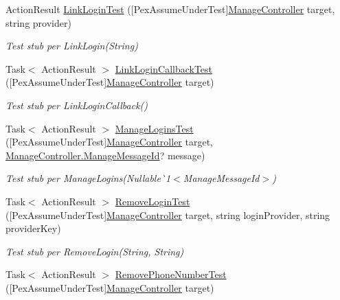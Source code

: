 \begin{DoxyCompactItemize}
Action\+Result \mbox{\hyperlink{class_brew_day2_1_1_controllers_1_1_tests_1_1_manage_controller_test_a28c6621b1ee50163a279783f74a0730a}{Link\+Login\+Test}} (\mbox{[}Pex\+Assume\+Under\+Test\mbox{]}\mbox{\hyperlink{class_brew_day2_1_1_controllers_1_1_manage_controller}{Manage\+Controller}} target, string provider)
\begin{DoxyCompactList}\small\item\em Test stub per Link\+Login(\+String)\end{DoxyCompactList}\item 
Task$<$ Action\+Result $>$ \mbox{\hyperlink{class_brew_day2_1_1_controllers_1_1_tests_1_1_manage_controller_test_ac1eea45ead13e91d1b7d87f7b072e0b2}{Link\+Login\+Callback\+Test}} (\mbox{[}Pex\+Assume\+Under\+Test\mbox{]}\mbox{\hyperlink{class_brew_day2_1_1_controllers_1_1_manage_controller}{Manage\+Controller}} target)
\begin{DoxyCompactList}\small\item\em Test stub per Link\+Login\+Callback()\end{DoxyCompactList}\item 
Task$<$ Action\+Result $>$ \mbox{\hyperlink{class_brew_day2_1_1_controllers_1_1_tests_1_1_manage_controller_test_a11c045a4deeaabd30404223005592828}{Manage\+Logins\+Test}} (\mbox{[}Pex\+Assume\+Under\+Test\mbox{]}\mbox{\hyperlink{class_brew_day2_1_1_controllers_1_1_manage_controller}{Manage\+Controller}} target, \mbox{\hyperlink{class_brew_day2_1_1_controllers_1_1_manage_controller_a418038dc90e9d94606f474b9c06fd8c8}{Manage\+Controller.\+Manage\+Message\+Id}}? message)
\begin{DoxyCompactList}\small\item\em Test stub per Manage\+Logins(Nullable\`{}1$<$Manage\+Message\+Id$>$)\end{DoxyCompactList}\item 
Task$<$ Action\+Result $>$ \mbox{\hyperlink{class_brew_day2_1_1_controllers_1_1_tests_1_1_manage_controller_test_a7e55796fc031c08e811854541aa8a7c6}{Remove\+Login\+Test}} (\mbox{[}Pex\+Assume\+Under\+Test\mbox{]}\mbox{\hyperlink{class_brew_day2_1_1_controllers_1_1_manage_controller}{Manage\+Controller}} target, string login\+Provider, string provider\+Key)
\begin{DoxyCompactList}\small\item\em Test stub per Remove\+Login(\+String, String)\end{DoxyCompactList}\item 
Task$<$ Action\+Result $>$ \mbox{\hyperlink{class_brew_day2_1_1_controllers_1_1_tests_1_1_manage_controller_test_a1e686a55a11caa8d22b9cb176b127763}{Remove\+Phone\+Number\+Test}} (\mbox{[}Pex\+Assume\+Under\+Test\mbox{]}\mbox{\hyperlink{class_brew_day2_1_1_controllers_1_1_manage_controller}{Manage\+Controller}} target)

\end{DoxyCompactItemize}
